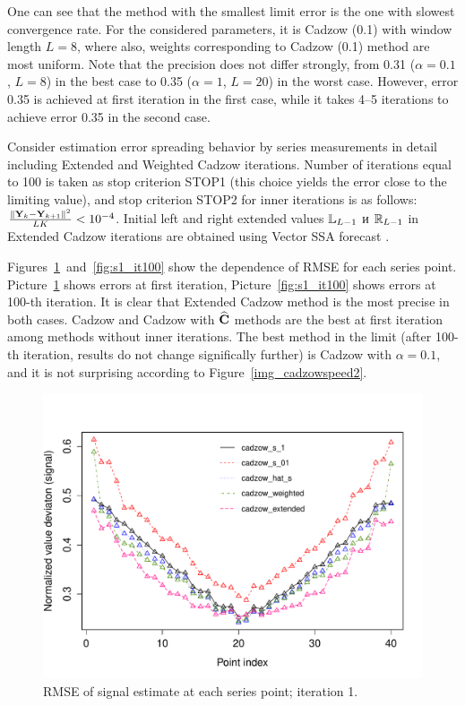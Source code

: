 \documentclass[sii]{ipart}
\begin{document}
One can see that the method with the smallest limit error is the one with slowest convergence rate. For the considered parameters, it is Cadzow (0.1) with window length $L=8$, where also, weights corresponding to Cadzow (0.1) method are most uniform.
Note that the precision does not differ strongly, from 0.31 ($\alpha=0.1$, $L=8$) in the best case to 0.35 ($\alpha=1$, $L=20$) in the worst case. However, error 0.35 is achieved at first iteration in the first case, while it takes 4--5 iterations to achieve error 0.35 in the second case.

Consider estimation error spreading behavior by series measurements in detail including Extended and Weighted Cadzow iterations. Number of iterations equal to 100 is taken as stop criterion STOP1 (this choice yields the error close to the limiting value), and stop criterion STOP2 for inner iterations is as follows:
$\frac{\|\mathbf{Y}_k - \mathbf{Y}_{k+1}\|^2}{LK} < 10^{-4}$. Initial left and right extended values $\mathbb{L}_{L-1}$ и $\mathbb{R}_{L-1}$ in Extended Cadzow iterations are obtained using Vector SSA forecast \cite[chapter 2.3.1]{Golyandina.etal2001}.

Figures~\ref{fig:s1_it1}~and~\ref{fig:s1_it100} show the dependence of RMSE for each series point. Picture~\ref{fig:s1_it1} shows errors at first iteration, Picture~\ref{fig:s1_it100} shows errors at 100-th iteration. It is clear that Extended Cadzow method is the most precise in both cases. Cadzow and Cadzow with $\widehat{\mathbf{C}}$ methods are the best at first iteration among methods without inner iterations. The best method in the limit (after 100-th iteration, results do not change significally further) is Cadzow with $\alpha=0.1$, and it is not surprising according to Figure~\ref{img_cadzowspeed2}.

\begin{figure}[!hhh]
		\includegraphics[width = \columnwidth]{s1_it1.pdf}
		\caption{RMSE of signal estimate at each series point; iteration 1.}
		\label{fig:s1_it1}
\end{figure}
\end{document}
